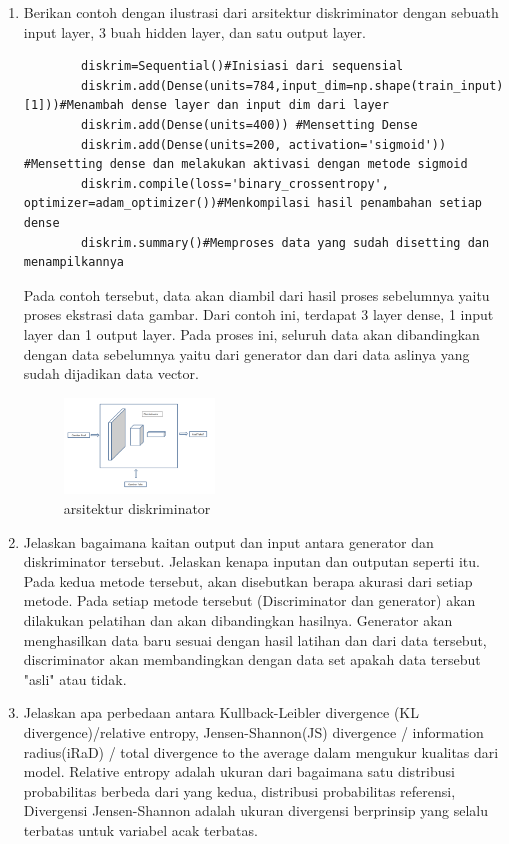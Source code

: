 \begin{enumerate}
    \item Berikan contoh dengan ilustrasi dari arsitektur diskriminator dengan sebuath input layer, 3 buah hidden layer, dan satu output layer.
    \hfill\break
    \begin{verbatim}
        diskrim=Sequential()#Inisiasi dari sequensial
        diskrim.add(Dense(units=784,input_dim=np.shape(train_input)[1]))#Menambah dense layer dan input dim dari layer
        diskrim.add(Dense(units=400)) #Mensetting Dense
        diskrim.add(Dense(units=200, activation='sigmoid')) #Mensetting dense dan melakukan aktivasi dengan metode sigmoid
        diskrim.compile(loss='binary_crossentropy', optimizer=adam_optimizer())#Menkompilasi hasil penambahan setiap dense
        diskrim.summary()#Memproses data yang sudah disetting dan menampilkannya
    \end{verbatim}
    Pada contoh tersebut, data akan diambil dari hasil proses sebelumnya yaitu proses ekstrasi data gambar. Dari contoh ini, terdapat 3 layer dense, 1 input layer dan 1 output layer. Pada proses ini, seluruh data akan dibandingkan dengan data sebelumnya yaitu dari generator dan dari data aslinya yang sudah dijadikan data vector. 
    \begin{figure}[H]
	    \centering
	    \includegraphics[width=4cm]{figures/1174077/8/t10.PNG}
	    \caption{arsitektur diskriminator}
    \end{figure}

    \item Jelaskan bagaimana kaitan output dan input antara generator dan diskriminator tersebut. Jelaskan kenapa inputan dan outputan seperti itu.
    \hfill\break
    Pada kedua metode tersebut, akan disebutkan berapa akurasi dari setiap metode. Pada setiap metode tersebut (Discriminator dan generator) akan dilakukan pelatihan dan akan dibandingkan hasilnya. Generator akan menghasilkan data baru sesuai dengan hasil latihan dan dari data tersebut, discriminator akan membandingkan dengan data set apakah data tersebut "asli" atau tidak. 

    \item Jelaskan apa perbedaan antara Kullback-Leibler divergence (KL divergence)/relative entropy, Jensen-Shannon(JS) divergence / information radius(iRaD) / total divergence to the average dalam mengukur kualitas dari model.
    \hfill\break
    Relative entropy adalah ukuran dari bagaimana satu distribusi probabilitas berbeda dari yang kedua, distribusi probabilitas referensi, Divergensi Jensen-Shannon adalah ukuran divergensi berprinsip yang selalu terbatas untuk variabel acak terbatas.
    

\end{enumerate}

